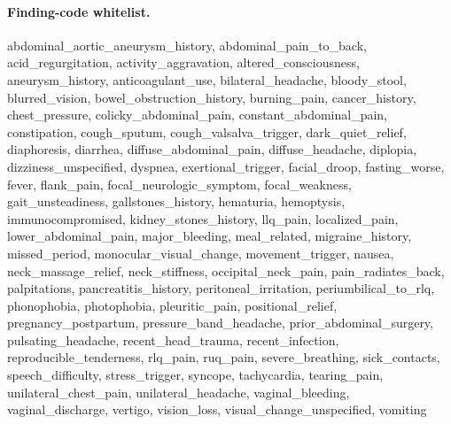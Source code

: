 \paragraph{Finding-code whitelist.}
abdominal\_\allowbreak{}aortic\_\allowbreak{}aneurysm\_\allowbreak{}history, abdominal\_\allowbreak{}pain\_\allowbreak{}to\_\allowbreak{}back, acid\_\allowbreak{}regurgitation, activity\_\allowbreak{}aggravation, altered\_\allowbreak{}consciousness, aneurysm\_\allowbreak{}history, anticoagulant\_\allowbreak{}use, bilateral\_\allowbreak{}headache, bloody\_\allowbreak{}stool, blurred\_\allowbreak{}vision, bowel\_\allowbreak{}obstruction\_\allowbreak{}history, burning\_\allowbreak{}pain, cancer\_\allowbreak{}history, chest\_\allowbreak{}pressure, colicky\_\allowbreak{}abdominal\_\allowbreak{}pain, constant\_\allowbreak{}abdominal\_\allowbreak{}pain, constipation, cough\_\allowbreak{}sputum, cough\_\allowbreak{}valsalva\_\allowbreak{}trigger, dark\_\allowbreak{}quiet\_\allowbreak{}relief, diaphoresis, diarrhea, diffuse\_\allowbreak{}abdominal\_\allowbreak{}pain, diffuse\_\allowbreak{}headache, diplopia, dizziness\_\allowbreak{}unspecified, dyspnea, exertional\_\allowbreak{}trigger, facial\_\allowbreak{}droop, fasting\_\allowbreak{}worse, fever, flank\_\allowbreak{}pain, focal\_\allowbreak{}neurologic\_\allowbreak{}symptom, focal\_\allowbreak{}weakness, gait\_\allowbreak{}unsteadiness, gallstones\_\allowbreak{}history, hematuria, hemoptysis, immunocompromised, kidney\_\allowbreak{}stones\_\allowbreak{}history, llq\_\allowbreak{}pain, localized\_\allowbreak{}pain, lower\_\allowbreak{}abdominal\_\allowbreak{}pain, major\_\allowbreak{}bleeding, meal\_\allowbreak{}related, migraine\_\allowbreak{}history, missed\_\allowbreak{}period, monocular\_\allowbreak{}visual\_\allowbreak{}change, movement\_\allowbreak{}trigger, nausea, neck\_\allowbreak{}massage\_\allowbreak{}relief, neck\_\allowbreak{}stiffness, occipital\_\allowbreak{}neck\_\allowbreak{}pain, pain\_\allowbreak{}radiates\_\allowbreak{}back, palpitations, pancreatitis\_\allowbreak{}history, peritoneal\_\allowbreak{}irritation, periumbilical\_\allowbreak{}to\_\allowbreak{}rlq, phonophobia, photophobia, pleuritic\_\allowbreak{}pain, positional\_\allowbreak{}relief, pregnancy\_\allowbreak{}postpartum, pressure\_\allowbreak{}band\_\allowbreak{}headache, prior\_\allowbreak{}abdominal\_\allowbreak{}surgery, pulsating\_\allowbreak{}headache, recent\_\allowbreak{}head\_\allowbreak{}trauma, recent\_\allowbreak{}infection, reproducible\_\allowbreak{}tenderness, rlq\_\allowbreak{}pain, ruq\_\allowbreak{}pain, severe\_\allowbreak{}breathing, sick\_\allowbreak{}contacts, speech\_\allowbreak{}difficulty, stress\_\allowbreak{}trigger, syncope, tachycardia, tearing\_\allowbreak{}pain, unilateral\_\allowbreak{}chest\_\allowbreak{}pain, unilateral\_\allowbreak{}headache, vaginal\_\allowbreak{}bleeding, vaginal\_\allowbreak{}discharge, vertigo, vision\_\allowbreak{}loss, visual\_\allowbreak{}change\_\allowbreak{}unspecified, vomiting
